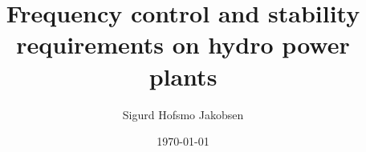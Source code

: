 \title{Frequency control and stability requirements on hydro power plants}
\author{Sigurd Hofsmo Jakobsen}
\date{\today}

\begin{frame}
  \titlepage
\end{frame}
